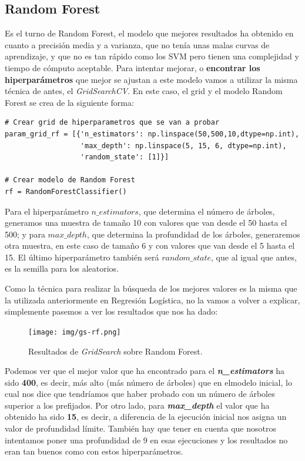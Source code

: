 \documentclass[11pt,a4paper]{article}
\begin{document}
\subsection{Random Forest}

Es el turno de Random Forest, el modelo que mejores resultados ha obtenido en cuanto a precisión media y a varianza, que no tenía unas
malas curvas de aprendizaje, y que no es tan rápido como los SVM pero tienen una complejidad y tiempo de cómputo aceptable. Para intentar
mejorar, o \textbf{encontrar los hiperparámetros} que mejor se ajustan a este modelo vamos a utilizar la misma técnica de antes, el
\textit{GridSearchCV}. En este caso, el grid y el modelo Random Forest se crea de la siguiente forma:

\begin{lstlisting}
# Crear grid de hiperparametros que se van a probar
param_grid_rf = [{'n_estimators': np.linspace(50,500,10,dtype=np.int),
                  'max_depth': np.linspace(5, 15, 6, dtype=np.int),
                  'random_state': [1]}]

# Crear modelo de Random Forest
rf = RandomForestClassifier()

\end{lstlisting}

Para el hiperparámetro $n\_estimators$, que determina el número de árboles, generamos una muestra de tamaño 10 con valores que van desde el
50 hasta el 500; y para $max\_depth$, que determina la profundidad de los árboles, generaremos otra muestra, en este caso de tamaño 6 y con
valores que van desde el 5 hasta el 15. El último hiperparámetro también será $random\_state$, que al igual que antes, es la semilla para
los aleatorios.

Como la técnica para realizar la búsqueda de los mejores valores es la misma que la utilizada anteriormente en Regresión Logística, no la
vamos a volver a explicar, simplemente pasemos a ver los resultados que nos ha dado:

\begin{figure}[H]
    \centering
    \texttt{[image: img/gs-rf.png]}
    \caption{Resultados de \textit{GridSearch} sobre Random Forest.}
    \label{fig:gs-rf}
\end{figure}

Podemos ver que el mejor valor que ha encontrado para el \textit{\textbf{n\_estimators}} ha sido \textbf{400}, es decir, más alto 
(más número de árboles) que en elmodelo inicial, lo cual nos dice que tendríamos que haber probado con un número de árboles superior a los 
prefijados. Por otro lado, para \textit{\textbf{max\_depth}} el valor que ha obtenido ha sido \textbf{15}, es decir, a diferencia de la ejecución inicial nos asigna 
un valor de profundidad límite. También hay que tener en cuenta que nosotros intentamos poner una profundidad de 9 en esas ejecuciones y 
los resultados no eran tan buenos como con estos hiperparámetros.
\end{document}
